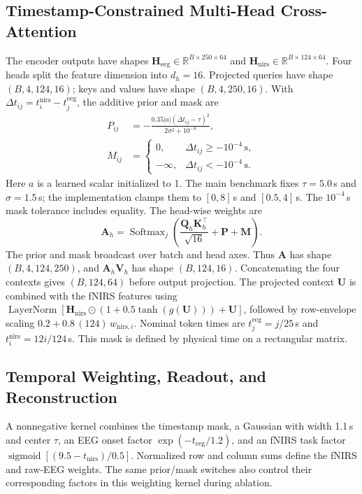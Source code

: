\documentclass[final,5p,times,twocolumn]{elsarticle}
\begin{document}
\subsection{Timestamp-Constrained Multi-Head Cross-Attention}
The encoder outputs have shapes $\mathbf{H}_{\mathrm{eeg}}\in\mathbb{R}^{B\times250\times64}$ and $\mathbf{H}_{\mathrm{nirs}}\in\mathbb{R}^{B\times124\times64}$. Four heads split the feature dimension into $d_h=16$. Projected queries have shape $(B,4,124,16)$; keys and values have shape $(B,4,250,16)$. With $\Delta t_{ij}=t_i^{\mathrm{nirs}}-t_j^{\mathrm{eeg}}$, the additive prior and mask are
\begin{align}
P_{ij}&=-\frac{0.35|a|(\Delta t_{ij}-\tau)^2}{2\sigma^2+10^{-8}},\\
M_{ij}&=\begin{cases}0,&\Delta t_{ij}\ge-10^{-4}\,\mathrm{s},\\-\infty,&\Delta t_{ij}<-10^{-4}\,\mathrm{s}.\end{cases}
\end{align}
Here $a$ is a learned scalar initialized to 1. The main benchmark fixes $\tau=5.0$\,s and $\sigma=1.5$\,s; the implementation clamps them to $[0,8]$\,s and $[0.5,4]$\,s. The $10^{-4}$\,s mask tolerance includes equality. The head-wise weights are
\begin{equation}
\mathbf{A}_h=\operatorname{Softmax}_{j}\!\left(\frac{\mathbf{Q}_h\mathbf{K}_h^\top}{\sqrt{16}}+\mathbf{P}+\mathbf{M}\right).
\end{equation}
The prior and mask broadcast over batch and head axes. Thus $\mathbf{A}$ has shape $(B,4,124,250)$, and $\mathbf{A}_h\mathbf{V}_h$ has shape $(B,124,16)$. Concatenating the four contexts gives $(B,124,64)$ before output projection. The projected context $\mathbf{U}$ is combined with the fNIRS features using $\operatorname{LayerNorm}[\mathbf{H}_{\mathrm{nirs}}\odot(1+0.5\tanh(g(\mathbf{U})))+\mathbf{U}]$, followed by row-envelope scaling $0.2+0.8\,(124)\,w_{\mathrm{nirs},i}$. Nominal token times are $t_j^{\mathrm{eeg}}=j/25$\,s and $t_i^{\mathrm{nirs}}=12i/124$\,s. This mask is defined by physical time on a rectangular matrix.

\subsection{Temporal Weighting, Readout, and Reconstruction}
A nonnegative kernel combines the timestamp mask, a Gaussian with width 1.1\,s and center $\tau$, an EEG onset factor $\exp(-t_{\mathrm{eeg}}/1.2)$, and an fNIRS task factor $\operatorname{sigmoid}[(9.5-t_{\mathrm{nirs}})/0.5]$. Normalized row and column sums define the fNIRS and raw-EEG weights. The same prior/mask switches also control their corresponding factors in this weighting kernel during ablation.
\end{document}
